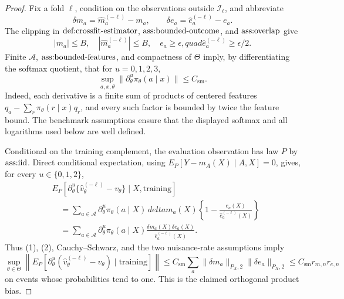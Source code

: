 \documentclass{article}
\begin{document}
\begin{proof}
Fix a fold \(\ell\), condition on the observations outside \(\mathcal I_\ell\), and abbreviate
\[
 \delta m_a=\widehat m_a^{(-\ell)}-m_a,
 \qquad
 \delta e_a=\widehat e_a^{(-\ell)}-e_a.
\]
The clipping in \(\textnormal{def:crossfit-estimator}\), \(\textnormal{ass:bounded-outcome}\), and \(\textnormal{ass:overlap}\) give
\[
 |m_a|\leq B,\quad |\widehat m_a^{(-\ell)}|\leq B,
 \quad e_a\geq\epsilon,quad
 \widehat e_a^{(-\ell)}\geq\epsilon/2.
 \tag{1}
\]
Finite \(\mathcal A\), \(\textnormal{ass:bounded-features}\), and compactness of \(\Theta\) imply, by differentiating the softmax quotient, that for \(u=0,1,2,3\),
\[
 \sup_{a,x,\theta}\|\partial_\theta^u\pi_\theta(a\mid x)\|\leq C_{\mathrm{sm}}.
 \tag{2}
\]
Indeed, each derivative is a finite sum of products of centered features \(q_a-\sum_r\pi_\theta(r\mid x)q_r\), and every such factor is bounded by twice the feature bound. The benchmark assumptions ensure that the displayed softmax and all logarithms used below are well defined.

Conditional on the training complement, the evaluation observation has law \(P\) by \(\textnormal{ass:iid}\). Direct conditional expectation, using \(E_P[Y-m_A(X)\mid A,X]=0\), gives, for every \(u\in\{0,1,2\}\),
\[
\begin{aligned}
 &E_P\left[\partial_\theta^u\{\widehat v_\theta^{(-\ell)}-v_\theta\}\mid X,\text{training}\right]\\
 &\quad=\sum_{a\in\mathcal A}\partial_\theta^u\pi_\theta(a\mid X)\,delta m_a(X)
       \left\{1-\frac{e_a(X)}{\widehat e_a^{(-\ell)}(X)}\right\}\\
 &\quad=\sum_{a\in\mathcal A}\partial_\theta^u\pi_\theta(a\mid X)
       \frac{\delta m_a(X)\delta e_a(X)}{\widehat e_a^{(-\ell)}(X)}.
\end{aligned}
\tag{3}
\]
Thus (1), (2), Cauchy--Schwarz, and the two nuisance-rate assumptions imply
\[
 \sup_{\theta\in\Theta}\left\|E_P\left[\partial_\theta^u
 (\widehat v_\theta^{(-\ell)}-v_\theta)\mid\text{training}\right]\right\|
 \leq C_{\mathrm{sm}}\sum_a\|\delta m_a\|_{P_X,2}\|\delta e_a\|_{P_X,2}
 \leq C_{\mathrm{sm}}r_{m,n}r_{e,n}
 \tag{4}
\]
on events whose probabilities tend to one. This is the claimed orthogonal product bias.


\end{proof}
\end{document}
